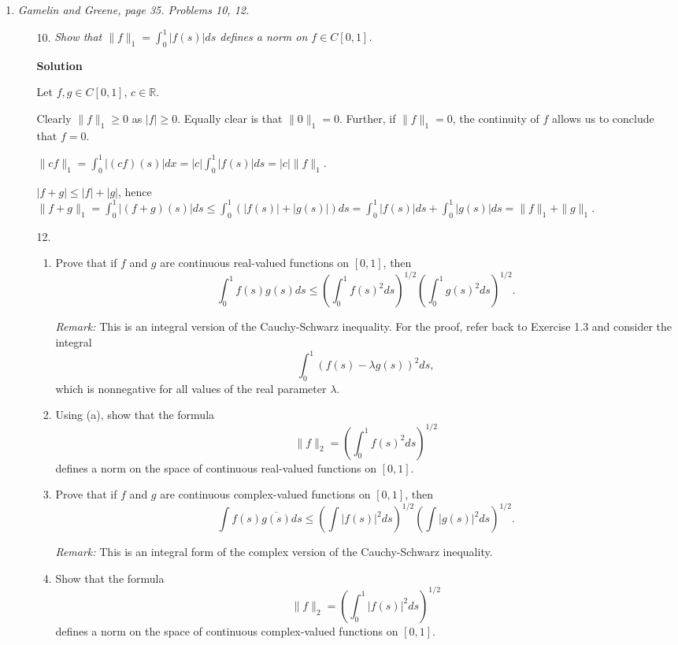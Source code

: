 \documentclass{article}
\begin{document}
\begin{enumerate}
\item {\em Gamelin and Greene, page 35.  Problems 10, 12.}

\begin{itemize}

\item[10.] {\em Show that \(\|f\|_1 = \int_0^1 |f(s)| ds\) defines a norm on \(f \in C[0,1]\).}

{\bf Solution}

Let \(f,g \in C[0,1]\), \(c \in \mathbb{R}\).

Clearly \(\|f\|_1 \geq 0\) as \(|f| \geq 0\).  Equally clear is that \(\|0\|_1 = 0\).  Further, if \(\|f\|_1 = 0\), the continuity of \(f\) allows us to conclude that \(f = 0\).

\(\|cf\|_1 = \int_0^1 |(cf)(s)| dx = |c| \int_0^1 |f(s)| ds = |c| \|f\|_1\).

\(|f + g| \leq |f| + |g|\), hence \(\|f + g\|_1 = \int_0^1 |(f + g)(s)| ds \leq \int_0^1 \left( |f(s)| + |g(s)| \right) ds = \int_0^1 |f(s)| ds + \int_0^1 |g(s)| ds = \|f\|_1 + \|g\|_1\).



\item[12.] {\em
\begin{enumerate}
\item Prove that if \(f\) and \(g\) are continuous real-valued functions on \([0,1]\), then
\[\int_0^1 f(s) g(s) ds \leq \left( \int_0^1 f(s)^2 ds \right)^{1/2} \left( \int_0^1 g(s)^2 ds \right)^{1/2}.\]

{\em Remark:}  This is an integral version of the Cauchy-Schwarz inequality.  For the proof, refer back to Exercise 1.3 and consider the integral
\[\int_0^1 \left( f(s) - \lambda g(s) \right)^2 ds,\]
which is nonnegative for all values of the real parameter \(\lambda\).
\item Using (a), show that the formula
\[\|f\|_2 = \left( \int_0^1 f(s)^2 ds \right)^{1/2}\]
defines a norm on the space of continuous real-valued functions on \([0,1]\).
\item Prove that if \(f\) and \(g\) are continuous complex-valued functions on \([0,1]\), then
\[\int f(s) \overline{g(s)} ds \leq \left( \int |f(s)|^2 ds \right)^{1/2} \left( \int |g(s)|^2 ds \right)^{1/2}.\]

{\em Remark:}  This is an integral form of the complex version of the Cauchy-Schwarz inequality.
\item Show that the formula
\[\|f\|_2 = \left( \int_0^1 |f(s)|^2 ds \right)^{1/2}\]
defines a norm on the space of continuous complex-valued functions on \([0,1]\).
\end{enumerate}}


\end{itemize}
\end{enumerate}
\end{document}
